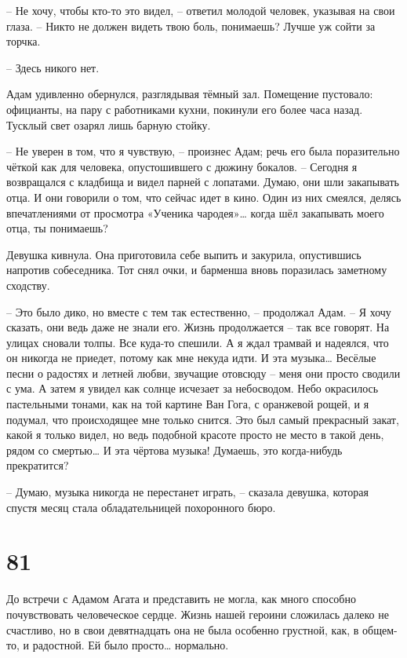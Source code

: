 \documentclass[
  a5paperpaper,
  DIV=11,
  numbers=noendperiod]{scrreprt}
\begin{document}
-- Не хочу, чтобы кто-то это видел, -- ответил молодой человек, указывая
на свои глаза. -- Никто не должен видеть твою боль, понимаешь? Лучше уж
сойти за торчка.

-- Здесь никого нет.

Адам удивленно обернулся, разглядывая тёмный зал. Помещение пустовало:
официанты, на пару с работниками кухни, покинули его более часа назад.
Тусклый свет озарял лишь барную стойку.

-- Не уверен в том, что я чувствую, -- произнес Адам; речь его была
поразительно чёткой как для человека, опустошившего с дюжину бокалов. --
Сегодня я возвращался с кладбища и видел парней с лопатами. Думаю, они
шли закапывать отца. И они говорили о том, что сейчас идет в кино. Один
из них смеялся, делясь впечатлениями от просмотра «Ученика
чародея»\ldots{} когда шёл закапывать моего отца, ты понимаешь?

Девушка кивнула. Она приготовила себе выпить и закурила, опустившись
напротив собеседника. Тот снял очки, и барменша вновь поразилась
заметному сходству.

-- Это было дико, но вместе с тем так естественно, -- продолжал Адам. --
Я хочу сказать, они ведь даже не знали его. Жизнь продолжается -- так
все говорят. На улицах сновали толпы. Все куда-то спешили. А я ждал
трамвай и надеялся, что он никогда не приедет, потому как мне некуда
идти. И эта музыка\ldots{} Весёлые песни о радостях и летней любви,
звучащие отовсюду -- меня они просто сводили с ума. А затем я увидел как
солнце исчезает за небосводом. Небо окрасилось пастельными тонами, как
на той картине Ван Гога, с оранжевой рощей, и я подумал, что
происходящее мне только снится. Это был самый прекрасный закат, какой я
только видел, но ведь подобной красоте просто не место в такой день,
рядом со смертью\ldots{} И эта чёртова музыка! Думаешь, это когда-нибудь
прекратится?

-- Думаю, музыка никогда не перестанет играть, -- сказала девушка,
которая спустя месяц стала обладательницей похоронного бюро.

\section*{81}\label{81}


До встречи с Адамом Агата и представить не могла, как много способно
почувствовать человеческое сердце. Жизнь нашей героини сложилась далеко
не счастливо, но в свои девятнадцать она не была особенно грустной, как,
в общем-то, и радостной. Ей было просто\ldots{} нормально.
\end{document}
